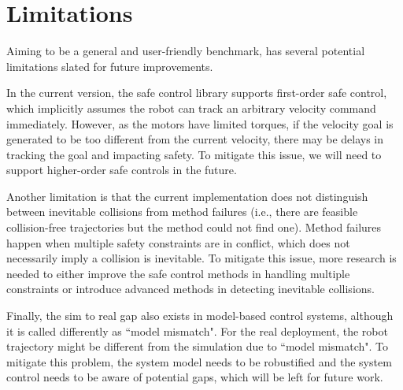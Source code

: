 \section{Limitations}
Aiming to be a general and user-friendly benchmark, \spark has several potential limitations slated for future improvements.

In the current version, the safe control library supports first-order safe control, which implicitly assumes the robot can track an arbitrary velocity command immediately. However, as the motors have limited torques, if the velocity goal is generated to be too different from the current velocity, there may be delays in tracking the goal and impacting safety. To mitigate this issue, we will need to support higher-order safe controls in the future. 

Another limitation is that the current implementation does not distinguish between inevitable collisions from method failures (i.e., there are feasible collision-free trajectories but the method could not find one). Method failures happen when multiple safety constraints are in conflict, which does not necessarily imply a collision is inevitable. To mitigate this issue, more research is needed to either improve the safe control methods in handling multiple constraints or introduce advanced methods in detecting inevitable collisions. 

Finally, the sim to real gap also exists in model-based control systems, although it is called differently as ``model mismatch". For the real deployment, the robot trajectory might be different from the simulation due to ``model mismatch". To mitigate this problem, the system model needs to be robustified and the system control needs to be aware of potential gaps, which will be left for future work.





